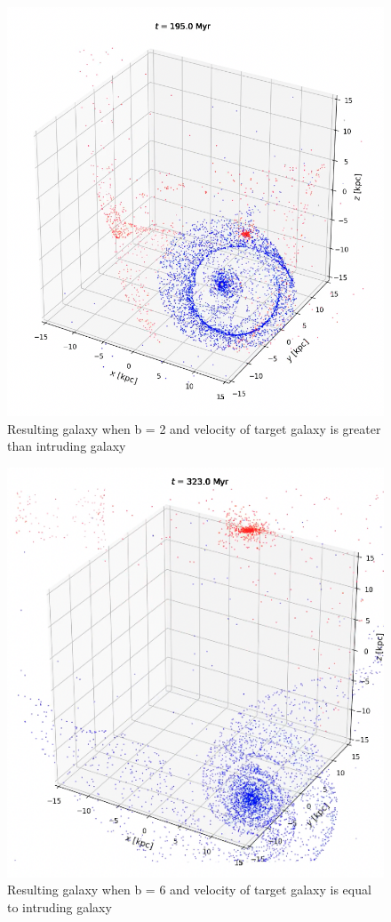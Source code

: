 \documentclass[linenumbers,RNAAS,trackchanges]{aastex631}
\begin{document}
\begin{figure}[H]
    \centering
    \includegraphics[scale=.40]{vip/b2targetv.png}
    \caption{Resulting galaxy when b = 2 and velocity of target galaxy is greater than intruding galaxy}
    \label{fig:code}
\end{figure}
\begin{figure}[H]
    \centering
    \includegraphics[scale=.50]{vip/b6equalv.png}
    \caption{Resulting galaxy when b = 6 and velocity of target galaxy is equal to intruding galaxy}
    \label{fig:code}
\end{figure}
\end{document}
